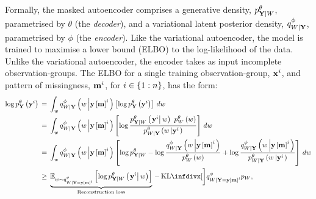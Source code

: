 \documentclass[../thesis.tex]{subfiles}
\begin{document}
Formally, the masked autoencoder comprises a generative density, $\myfunc{p}^{\theta}_{\mygroup{\myrv{y}} | \myrv{w}}$, parametrised by $\theta$ (the \textit{decoder}), and a variational latent posterior density, $\myfunc{q}^{\phi}_{\myrv{w} | \mygroup{\myrv{y}}}$, parametrised by $\phi$ (the \textit{encoder}). Like the variational autoencoder, the model is trained to maximise a lower bound (ELBO) to the log-likelihood of the data. Unlike the variational autoencoder, the encoder takes as input incomplete observation-groups. The ELBO for a single training observation-group, $\mathbf{{x}}^i$, and pattern of missingness, $\mathbf{{m}}^i$, for $i \in \left\{1:n\right\}$, has the form: 
\begin{equation} \label{eq:masked-elbo}
\begin{split}
    \log \myfunc{p}^{\theta}_{\mygroup{\myrv{y}}} \left( \mygroup{\myvect{y}}^i \right)
    \, &= \, 
    \int_{\myvect{w}} \myfunc{q}^{\phi}_{\myrv{w} | \mygroup{\myrv{y}}} \left( \myvect{w} \left\vert \mygroup{\myvect{y}} \left[ \mygroup{\myvect{m}} \right]^i \right. \right) \left[ \log \myfunc{p}^{\theta}_{\mygroup{\myrv{y}}} \left( \mygroup{\myvect{y}}^i \right) \right] \, d \myvect{w} \\
    \, &= \, 
    \int_{\myvect{w}} 
    \myfunc{q}^{\phi}_{\myrv{w} | \mygroup{\myrv{y}}} \left( \myvect{w} \left\vert \mygroup{\myvect{y}} \left[ \mygroup{\myvect{m}} \right]^i \right. \right) 
    \left[ \log \frac{\myfunc{p}^{\theta}_{\mygroup{\myrv{y}} | \myrv{w}} \left( \left. \mygroup{\myvect{y}}^i \right\vert \myvect{w} \right) ~ \myfunc{p}^{\theta}_{\myrv{w}} \left( \myvect{w}\right)}{\myfunc{p}^{\theta}_{\myrv{w} | \mygroup{\myrv{y}}} \left( \myvect{w} \left\vert \mygroup{\myvect{y}}^i \right. \right)}\right] \, d \myvect{w} \\
    &= \, 
    \int_{\myvect{w}} \myfunc{q}^{\phi}_{\myrv{w} | \mygroup{\myrv{y}}} \left( \myvect{w} \left\vert \mygroup{\myvect{y}} \left[ \mygroup{\myvect{m}} \right]^i \right. \right) 
    \left[ \log \myfunc{p}^{\theta}_{\mygroup{\myrv{y}} | \myrv{w}} 
    - \log \frac{\myfunc{q}^{\phi}_{\myrv{w} | \mygroup{\myrv{y}}} \left( \myvect{w} \left\vert \mygroup{\myvect{y}} \left[ \mygroup{\myvect{m}} \right]^i \right. \right)}{\myfunc{p}^{\theta}_{\myrv{w}} \left( \myvect{w} \right)} 
    + \log \frac{\myfunc{q}^{\phi}_{\myrv{w} | \mygroup{\myrv{y}}} \left( \myvect{w} \left\vert \mygroup{\myvect{y}} \left[ \mygroup{\myvect{m}} \right]^i \right. \right)}{\myfunc{p}^{\theta}_{\myrv{w} | \mygroup{\myrv{y}}} \left( \myvect{w} \left\vert \mygroup{\myvect{y}}^i \right. \right)} \right] \, d\myvect{w} \\
    \, &\geq \, 
    \underbrace{\mathbb{E}_{\myvect{w} \sim \myfunc{q}^{\phi}_{\myrv{w} | \mygroup{\myrv{y}} = \mygroup{\myvect{y}} \left[ \mygroup{\myvect{m}} \right]^i }} 
    \left[ \log \myfunc{p}^{\theta}_{\mygroup{\myrv{y}} | \myrv{w}} \left( \left. \mygroup{\myvect{y}}^i \right\vert \myvect{w} \right) \right] }_{\text{Reconstruction loss}}
    \, - \,
    \kl[\bigg]{\myfunc{q}^{\phi}_{\myrv{w} | \mygroup{\myrv{y}} = \mygroup{\myvect{y}} \left[ \mygroup{\myvect{m}} \right]^i}}{\myfunc{p}_{\myrv{w}}},
\end{split}
\end{equation}
\end{document}
